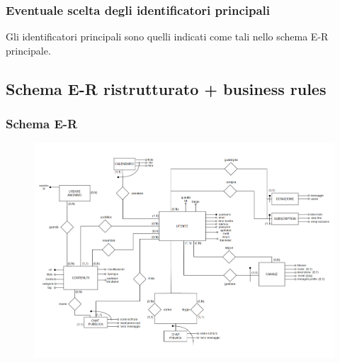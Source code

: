 \subsubsection{Eventuale scelta degli identificatori principali}
Gli identificatori principali sono quelli indicati come tali nello schema E-R principale.



\newpage
{}
\begin{landscape}
\subsection{Schema E-R ristrutturato + business rules}
\vspace{-\parskip} %
\subsubsection{Schema E-R}
\vspace{-\parskip} %
\begin{figure}[h]
    \centering
    \includegraphics[scale=0.6]{img/ER2.png}
\end{figure}
\end{landscape}
\restoregeometry

